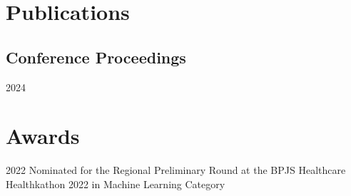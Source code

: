 \documentclass[12pt,letterpaper]{report}
\begin{document}
    \section*{Publications}

    \subsection*{Conference Proceedings}
    \begin{tablist}
        \item[2024] \tab{}
    \end{tablist}



    \section*{Awards}
    \begin{tablist}
        \item[2022] \tab{}Nominated for the Regional Preliminary Round at the BPJS Healthcare Healthkathon 2022 in Machine Learning Category
    \end{tablist}

\end{document}
